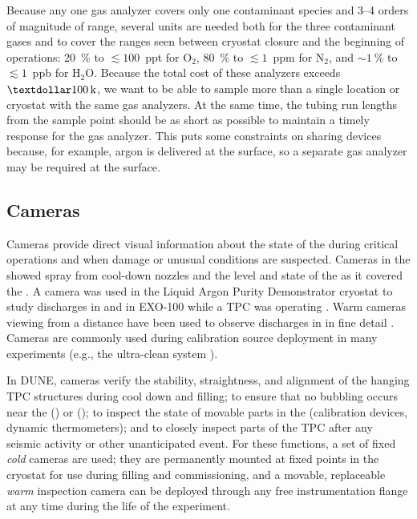 Because any one gas analyzer covers only one contaminant species and \numrange{3}{4} orders of magnitude of range, several units are needed both for the three contaminant gases and to cover the ranges seen between  cryostat closure and the beginning of  operations:
\SI{20}{\percent} to $\lesssim 100$~ppt for $\text{O}_2$,
\SI{80}{\percent} to $\lesssim 1$~ppm for $\text{N}_2$, and
$\sim \SI{1}{\percent}$ to $\lesssim 1$~ppb for $\text{H}_2\text{O}$.
Because the total cost of these analyzers exceeds $\SI{100}[\textdollar]{k}$, we want to be able to  sample more than a single location or cryostat with the same gas analyzers. At the same time, the tubing run lengths from the sample point should be as short as possible to maintain a timely response for the gas analyzer. This puts some constraints on sharing devices because, for example, argon is delivered at the surface, so a separate gas analyzer may be required at the surface.


\subsection{Cameras}

Cameras provide direct visual information about the state of the
 during critical operations and when damage or unusual
conditions are suspected.  Cameras in the  showed spray from cool-down
nozzles and the level and state of the \lar as it covered the  \cite{Murphy:20170516}.  A camera was
used in the Liquid Argon Purity Demonstrator
cryostat\cite{Adamowski:2014daa} to study  discharges in
\lar and in EXO-100 while a TPC was operating
\cite{Delaquis:2013hva}.  Warm cameras viewing \lar from a distance
have been used to observe  discharges in \lar in
fine detail \cite{Auger:2015xlo}.  Cameras are commonly used during
calibration source deployment in many experiments (e.g., the
\kamland ultra-clean system \cite{Banks:2014hra}).

In DUNE, cameras verify the stability, straightness,
and alignment of the hanging TPC structures during cool down and
filling; to ensure that no bubbling occurs near the 
(\single) or  (\dual); to inspect the
state of movable parts in the  (calibration devices, dynamic
thermometers); and to closely inspect parts of the TPC after any seismic activity or other unanticipated
event.  For these functions, a set of fixed
\textit{cold} cameras are used; they are permanently mounted at fixed points in the cryostat
for use during filling and commissioning, and a movable, replaceable
\textit{warm} inspection camera can be deployed through any free
instrumentation flange at any time during the life of the
experiment. 

